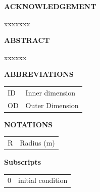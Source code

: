 \documentclass[12pt,a4paper,oneside]{report}
\begin{document}
\newpage

\thispagestyle{empty}
\vspace*{3cm}
\begin{center}  {\large \bf ACKNOWLEDGEMENT}\end{center}
\vspace{1cm}
xxxxxxx
\newpage
\vspace*{2cm}
\begin{center}  {\Large \bf ABSTRACT}\end{center}
\vspace{1cm}
\noindent  

xxxxxx



\newpage
{}
\thispagestyle{empty}

\newpage
\tableofcontents 	
\cleardoublepage 

\listoftables 	\cleardoublepage 
\listoffigures 	\cleardoublepage

\newpage
\begin{center}  {\Large \bf ABBREVIATIONS}\end{center}
\vspace{1cm}\doublespacing
\begin{tabular}{l l}

ID & Inner dimension \\
OD & Outer Dimension \\

\end{tabular} 

\newpage
\begin{center}  {\Large \bf NOTATIONS}\end{center}

\begin{longtable}{l l}

R & Radius (m)\\

\end{longtable} 



\begin{center}  {\Large \bf Subscripts}\end{center}

\begin{longtable}{l l}

0 & initial condition \\

\end{longtable} 
\newpage
\end{document}
